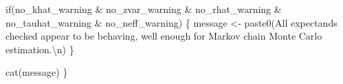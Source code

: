 \documentclass[
  letterpaper,
  DIV=11,
  numbers=noendperiod]{scrartcl}
\newenvironment{Shaded}{\begin{snugshade}}{\end{snugshade}}
\newcommand{\ControlFlowTok}[1]{\textcolor[rgb]{0.00,0.23,0.31}{#1}}
\newcommand{\FunctionTok}[1]{\textcolor[rgb]{0.28,0.35,0.67}{#1}}
\newcommand{\NormalTok}[1]{\textcolor[rgb]{0.00,0.23,0.31}{#1}}
\newcommand{\OtherTok}[1]{\textcolor[rgb]{0.00,0.23,0.31}{#1}}
\newcommand{\SpecialCharTok}[1]{\textcolor[rgb]{0.37,0.37,0.37}{#1}}
\newcommand{\StringTok}[1]{\textcolor[rgb]{0.13,0.47,0.30}{#1}}
\begin{document}
\begin{Shaded}
\begin{Highlighting}[]
  \ControlFlowTok{if}\NormalTok{(no\_khat\_warning }\SpecialCharTok{\&}\NormalTok{ no\_zvar\_warning }\SpecialCharTok{\&}\NormalTok{ no\_rhat\_warning }\SpecialCharTok{\&}\NormalTok{ no\_tauhat\_warning }\SpecialCharTok{\&}\NormalTok{ no\_neff\_warning) \{}
\NormalTok{    message }\OtherTok{\textless{}{-}} \FunctionTok{paste0}\NormalTok{(}\StringTok{\textquotesingle{}All expectands checked appear to be behaving\textquotesingle{}}\NormalTok{,}
                      \StringTok{\textquotesingle{}well enough for Markov chain Monte Carlo estimation.}\SpecialCharTok{\textbackslash{}n}\StringTok{\textquotesingle{}}\NormalTok{)}
\NormalTok{  \}}

  \FunctionTok{cat}\NormalTok{(message)}
\NormalTok{\}}
\end{Highlighting}
\end{Shaded}
\end{document}
